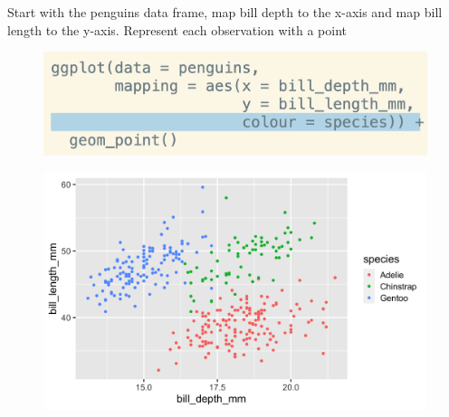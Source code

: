 \documentclass[11pt]{beamer}
\begin{document}
	\begin{frame}
	

	Start with the penguins data frame, map bill depth to the x-axis and map bill length to the y-axis. Represent each observation with a point 
	
	\begin{minipage}[t]{0.5\linewidth}
		\begin{figure}
			\centering
			\includegraphics[width=1\linewidth]{Images/S2/code/s10}
			
		\end{figure}
	\end{minipage}%
	\begin{minipage}[t]{0.5\linewidth}
		
		\begin{figure}
			\centering
			\includegraphics[width=1\linewidth]{Images/S2/penguins-4-1}
			
		\end{figure}
		
		
	\end{minipage}
	
\end{frame}
\end{document}
